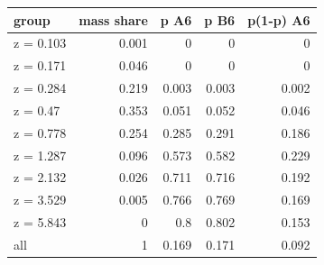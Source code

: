 \begin{tabular}{lrrrr}
\toprule
group & mass share & p A6 & p B6 & p(1-p) A6 \\
\midrule
z = 0.103 & 0.001 & 0 & 0 & 0 \\
z = 0.171 & 0.046 & 0 & 0 & 0 \\
z = 0.284 & 0.219 & 0.003 & 0.003 & 0.002 \\
z = 0.47 & 0.353 & 0.051 & 0.052 & 0.046 \\
z = 0.778 & 0.254 & 0.285 & 0.291 & 0.186 \\
z = 1.287 & 0.096 & 0.573 & 0.582 & 0.229 \\
z = 2.132 & 0.026 & 0.711 & 0.716 & 0.192 \\
z = 3.529 & 0.005 & 0.766 & 0.769 & 0.169 \\
z = 5.843 & 0 & 0.8 & 0.802 & 0.153 \\
all & 1 & 0.169 & 0.171 & 0.092 \\
\bottomrule
\end{tabular}
